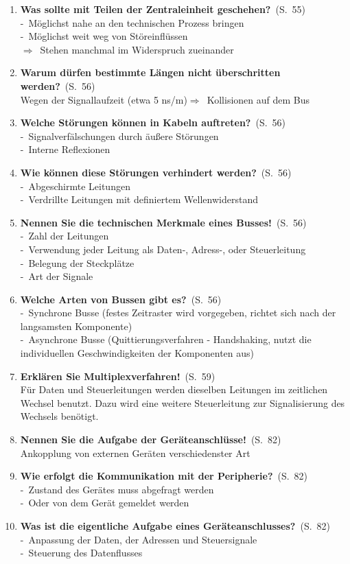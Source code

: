\documentclass[a4paper,12pt]{article}
\newcommand{\question}[3]{\pagebreak[3]\item {\textbf{#1?}}\ (S.\ #2)#3}
\newcommand{\statement}[3]{\pagebreak[3]\item {\textbf{#1!}}\ (S.\ #2)#3}
\newcommand{\catchword}[1]{\\-\ #1}
\newcommand{\normaltext}[1]{\\#1}
\newcommand{\result}[1]{\\$\Rightarrow$\ #1}
\newcommand{\resultol}[1]{$\Rightarrow$\ #1}
\newcommand{\page}[1]{#1}
\begin{document}
\begin{enumerate}
  \question{Was sollte mit Teilen der Zentraleinheit geschehen}{\page{55}}
  {
    \catchword{Möglichst nahe an den technischen Prozess bringen}
    \catchword{Möglichst weit weg von Störeinflüssen}
    \result{Stehen manchmal im Widerspruch zueinander}
  }

  \question{Warum dürfen bestimmte Längen nicht überschritten werden}{\page{56}}
  {
    \normaltext{Wegen der Signallaufzeit (etwa 5 ns/m)\resultol{Kollisionen auf dem Bus}}
  }

  \question{Welche Störungen können in Kabeln auftreten}{\page{56}}
  {
    \catchword{Signalverfälschungen durch äußere Störungen}
    \catchword{Interne Reflexionen}
  }

  \question{Wie können diese Störungen verhindert werden}{\page{56}}
  {
    \catchword{Abgeschirmte Leitungen}
    \catchword{Verdrillte Leitungen mit definiertem Wellenwiderstand}
  }

  \statement{Nennen Sie die technischen Merkmale eines Busses}{\page{56}}
  {
    \catchword{Zahl der Leitungen}
    \catchword{Verwendung jeder Leitung als Daten-, Adress-, oder Steuerleitung}
    \catchword{Belegung der Steckplätze}
    \catchword{Art der Signale}
  }

  \question{Welche Arten von Bussen gibt es}{\page{56}}
  {
    \catchword{Synchrone Busse (festes Zeitraster wird vorgegeben, richtet sich nach der 
               langsamsten Komponente)}
    \catchword{Asynchrone Busse (Quittierungsverfahren - Handshaking, nutzt die individuellen
               Geschwindigkeiten der Komponenten aus)}
  }

  \statement{Erklären Sie Multiplexverfahren}{\page{59}}
  {
    \normaltext{Für Daten und Steuerleitungen werden dieselben Leitungen im zeitlichen Wechsel
                benutzt. Dazu wird eine weitere Steuerleitung zur Signalisierung des Wechsels benötigt.}
  }

  \statement{Nennen Sie die Aufgabe der Geräteanschlüsse}{\page{82}}
  {
    \normaltext{Ankopplung von externen Geräten verschiedenster Art}
  }

  \question{Wie erfolgt die Kommunikation mit der Peripherie}{\page{82}}
  {
    \catchword{Zustand des Gerätes muss abgefragt werden}
    \catchword{Oder von dem Gerät gemeldet werden}
  }

  \question{Was ist die eigentliche Aufgabe eines Geräteanschlusses}{\page{82}}
  {
    \catchword{Anpassung der Daten, der Adressen und Steuersignale}
    \catchword{Steuerung des Datenflusses}
  }


\end{enumerate}
\end{document}
